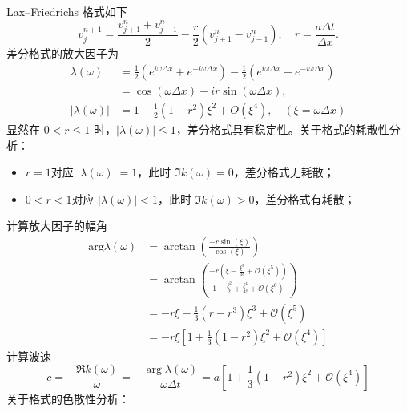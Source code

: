 \begin{solution*}
    Lax–Friedrichs 格式如下
    \[
        v_{j}^{n+1} = \frac{v_{j+1}^n+v_{j-1}^n}{2} - \frac{r}2 (v_{j+1}^n-v_{j-1}^n),\quad r = \frac{a \Delta t}{\Delta x}.
    \]
    差分格式的放大因子为
    \begin{align*}
        \lambda(\omega)   & = \frac{1}2(e^{i \omega \Delta x} + e^{- i \omega \Delta x})
        - \frac{1}2 (e^{i \omega \Delta x} - e^{- i \omega \Delta x})                            \\
                          & =
        \cos(\omega \Delta x) - i r \sin(\omega \Delta x),                                       \\
        |\lambda(\omega)| & = 1 - \frac12 (1-r^2) \xi^2 + O(\xi^4),\quad (\xi = \omega \Delta x)
    \end{align*}
    显然在 $ 0< r \le 1$ 时，$|\lambda(\omega)| \le 1$，差分格式具有稳定性。关于格式的耗散性分析：
    \begin{itemize}
        \item $r=1$对应 $|\lambda(\omega)| = 1$，此时 $\Im k(\omega) = 0$，差分格式无耗散；
        \item $0<r<1$对应 $|\lambda(\omega)| < 1$，此时 $\Im k(\omega) > 0$，差分格式有耗散；
    \end{itemize}
    计算放大因子的幅角
    \begin{align*}
        \text{arg} \lambda(\omega) & =
        \arctan \left(\frac{
                - r \sin(\xi)
            }{
                \cos(\xi)
            }     \right)
        \\
                                   & =
        \arctan \left(\frac{
                -r (\xi - \frac{\xi^3}{3!} + \mathcal{O}(\xi^5))
            }{
                1 - \frac{\xi^2}2 + \frac{\xi^4}{4!} + \mathcal{O}(\xi^6)
        }     \right)                                           \\
                                   & =
        - r \xi - \frac13 (r - r^3) \xi^3 +  \mathcal{O}(\xi^5) \\
                                   & = - r\xi \left[
            1 + \frac13 (1-r^2)\xi^2 +  \mathcal{O}(\xi^4)
            \right]
    \end{align*}
    计算波速
    \[
        c = -\frac{\Re k(\omega)}{\omega} = - \frac{\arg \lambda(\omega)}{ \omega\Delta t} = a  \left[
            1 + \frac13 (1-r^2)\xi^2 +  \mathcal{O}(\xi^4)
            \right]
    \]
    关于格式的色散性分析：
    \begin{itemize}

\end{itemize}
\end{solution*}
